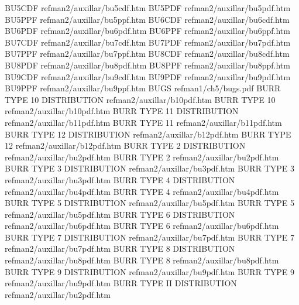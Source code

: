 BU5CDF                                  refman2/auxillar/bu5cdf.htm
BU5PDF                                  refman2/auxillar/bu5pdf.htm
BU5PPF                                  refman2/auxillar/bu5ppf.htm
BU6CDF                                  refman2/auxillar/bu6cdf.htm
BU6PDF                                  refman2/auxillar/bu6pdf.htm
BU6PPF                                  refman2/auxillar/bu6ppf.htm
BU7CDF                                  refman2/auxillar/bu7cdf.htm
BU7PDF                                  refman2/auxillar/bu7pdf.htm
BU7PPF                                  refman2/auxillar/bu7ppf.htm
BU8CDF                                  refman2/auxillar/bu8cdf.htm
BU8PDF                                  refman2/auxillar/bu8pdf.htm
BU8PPF                                  refman2/auxillar/bu8ppf.htm
BU9CDF                                  refman2/auxillar/bu9cdf.htm
BU9PDF                                  refman2/auxillar/bu9pdf.htm
BU9PPF                                  refman2/auxillar/bu9ppf.htm
BUGS                                    refman1/ch5/bugs.pdf
BURR TYPE 10 DISTRIBUTION               refman2/auxillar/b10pdf.htm
BURR TYPE 10                            refman2/auxillar/b10pdf.htm
BURR TYPE 11 DISTRIBUTION               refman2/auxillar/b11pdf.htm
BURR TYPE 11                            refman2/auxillar/b11pdf.htm
BURR TYPE 12 DISTRIBUTION               refman2/auxillar/b12pdf.htm
BURR TYPE 12                            refman2/auxillar/b12pdf.htm
BURR TYPE 2 DISTRIBUTION                refman2/auxillar/bu2pdf.htm
BURR TYPE 2                             refman2/auxillar/bu2pdf.htm
BURR TYPE 3 DISTRIBUTION                refman2/auxillar/bu3pdf.htm
BURR TYPE 3                             refman2/auxillar/bu3pdf.htm
BURR TYPE 4 DISTRIBUTION                refman2/auxillar/bu4pdf.htm
BURR TYPE 4                             refman2/auxillar/bu4pdf.htm
BURR TYPE 5 DISTRIBUTION                refman2/auxillar/bu5pdf.htm
BURR TYPE 5                             refman2/auxillar/bu5pdf.htm
BURR TYPE 6 DISTRIBUTION                refman2/auxillar/bu6pdf.htm
BURR TYPE 6                             refman2/auxillar/bu6pdf.htm
BURR TYPE 7 DISTRIBUTION                refman2/auxillar/bu7pdf.htm
BURR TYPE 7                             refman2/auxillar/bu7pdf.htm
BURR TYPE 8 DISTRIBUTION                refman2/auxillar/bu8pdf.htm
BURR TYPE 8                             refman2/auxillar/bu8pdf.htm
BURR TYPE 9 DISTRIBUTION                refman2/auxillar/bu9pdf.htm
BURR TYPE 9                             refman2/auxillar/bu9pdf.htm
BURR TYPE II DISTRIBUTION               refman2/auxillar/bu2pdf.htm
